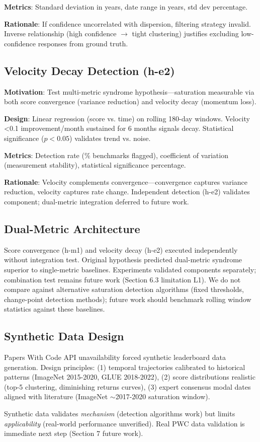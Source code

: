 \textbf{Metrics}: Standard deviation in years, date range in years, std dev percentage.

\textbf{Rationale}: If confidence uncorrelated with dispersion, filtering strategy invalid. Inverse relationship (high confidence $\rightarrow$ tight clustering) justifies excluding low-confidence responses from ground truth.

\subsection{Velocity Decay Detection (h-e2)}

\textbf{Motivation}: Test multi-metric syndrome hypothesis---saturation measurable via both score convergence (variance reduction) and velocity decay (momentum loss).

\textbf{Design}: Linear regression (score vs. time) on rolling 180-day windows. Velocity <0.1 improvement/month sustained for 6 months signals decay. Statistical significance ($p<0.05$) validates trend vs. noise.

\textbf{Metrics}: Detection rate (\% benchmarks flagged), coefficient of variation (measurement stability), statistical significance percentage.

\textbf{Rationale}: Velocity complements convergence---convergence captures variance reduction, velocity captures rate change. Independent detection (h-e2) validates component; dual-metric integration deferred to future work.

\subsection{Dual-Metric Architecture}

Score convergence (h-m1) and velocity decay (h-e2) executed independently without integration test. Original hypothesis predicted dual-metric syndrome superior to single-metric baselines. Experiments validated components separately; combination test remains future work (Section 6.3 limitation L1). We do not compare against alternative saturation detection algorithms (fixed thresholds, change-point detection methods); future work should benchmark rolling window statistics against these baselines.

\subsection{Synthetic Data Design}

Papers With Code API unavailability forced synthetic leaderboard data generation. Design principles: (1) temporal trajectories calibrated to historical patterns (ImageNet 2015-2020, GLUE 2018-2022), (2) score distributions realistic (top-5 clustering, diminishing returns curves), (3) expert consensus modal dates aligned with literature (ImageNet $\sim$2017-2020 saturation window).

Synthetic data validates \emph{mechanism} (detection algorithms work) but limits \emph{applicability} (real-world performance unverified). Real PWC data validation is immediate next step (Section 7 future work).
